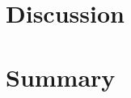 \section{Discussion}
\label{sec:study1-discussion}

\section{Summary}
\label{sec:study1-summary}

%
%   
%
